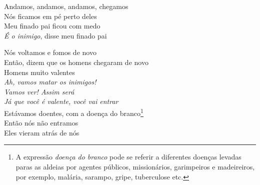 \bigskip

\begin{linenumbers}
 
\noindent   Andamos, andamos, andamos, chegamos\\
  Nós ficamos em pé perto deles\\
  Meu finado pai ficou com medo\\
  \textit{É o inimigo}, disse meu finado pai
 
\end{linenumbers}

\bigskip

\begin{linenumbers}
 
\noindent   Nós voltamos e fomos de novo\\
  Então, dizem que os homens chegaram de novo\\
  Homens muito valentes\\
  \textit{Ah, vamos matar os inimigos!}\\
  \textit{Vamos ver! Assim será}\\
  \textit{Já que você é valente, você vai entrar}\\
  Estávamos doentes, com a doença do branco\footnote{A expressão
   \textit{doença do branco} pode se referir a diferentes doenças levadas
   paras as aldeias por agentes públicos, missionários, garimpeiros e
   madeireiros, por exemplo, malária, sarampo, gripe, tuberculose etc.}\\
  Então nós não entramos\\
  Eles vieram atrás de nós
 
\end{linenumbers}

